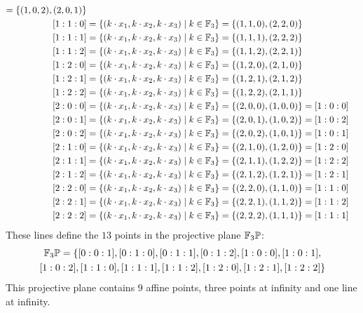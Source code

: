 \begin{example}
\begin{align*}
          = \{(1,0,2), (2,0,1)\}\\
[1:1:0] &= \{(k\cdot x_1,k\cdot x_2, k\cdot x_3)\;|\; k\in\mathbb{F}_3\}
          = \{(1,1,0), (2,2,0)\}\\
[1:1:1] &= \{(k\cdot x_1,k\cdot x_2, k\cdot x_3)\;|\; k\in\mathbb{F}_3\}
          = \{(1,1,1), (2,2,2)\}\\
[1:1:2]&= \{(k\cdot x_1,k\cdot x_2, k\cdot x_3)\;|\; k\in\mathbb{F}_3\}
          = \{(1,1,2), (2,2,1)\}\\
[1:2:0] &= \{(k\cdot x_1,k\cdot x_2, k\cdot x_3)\;|\; k\in\mathbb{F}_3\}
          = \{(1,2,0), (2,1,0)\}\\
[1:2:1] &= \{(k\cdot x_1,k\cdot x_2, k\cdot x_3)\;|\; k\in\mathbb{F}_3\}
          = \{(1,2,1), (2,1,2)\}\\
[1:2:2] &= \{(k\cdot x_1,k\cdot x_2, k\cdot x_3)\;|\; k\in\mathbb{F}_3\}
          = \{(1,2,2), (2,1,1)\}\\
[2:0:0] &= \{(k\cdot x_1,k\cdot x_2, k\cdot x_3)\;|\; k\in\mathbb{F}_3\}
          = \{(2,0,0), (1,0,0)\}
          = [1:0:0]\\
[2:0:1] &= \{(k\cdot x_1,k\cdot x_2, k\cdot x_3)\;|\; k\in\mathbb{F}_3\}
          = \{(2,0,1), (1,0,2)\}
          = [1:0:2]\\
[2:0:2] &= \{(k\cdot x_1,k\cdot x_2, k\cdot x_3)\;|\; k\in\mathbb{F}_3\}
          = \{(2,0,2), (1,0,1)\}
          = [1:0:1]\\
[2:1:0] &= \{(k\cdot x_1,k\cdot x_2, k\cdot x_3)\;|\; k\in\mathbb{F}_3\}
          = \{(2,1,0), (1,2,0)\}
          = [1:2:0]\\
[2:1:1] &= \{(k\cdot x_1,k\cdot x_2, k\cdot x_3)\;|\; k\in\mathbb{F}_3\}
          = \{(2,1,1), (1,2,2)\}
          = [1:2:2]\\
[2:1:2] &= \{(k\cdot x_1,k\cdot x_2, k\cdot x_3)\;|\; k\in\mathbb{F}_3\}
          = \{(2,1,2), (1,2,1)\}
          = [1:2:1]\\
[2:2:0] &= \{(k\cdot x_1,k\cdot x_2, k\cdot x_3)\;|\; k\in\mathbb{F}_3\}
          = \{(2,2,0), (1,1,0)\}
          = [1:1:0]\\
[2:2:1] &= \{(k\cdot x_1,k\cdot x_2, k\cdot x_3)\;|\; k\in\mathbb{F}_3\}
          = \{(2,2,1), (1,1,2)\}
          = [1:1:2]\\
[2:2:2] &= \{(k\cdot x_1,k\cdot x_2, k\cdot x_3)\;|\; k\in\mathbb{F}_3\}
          = \{(2,2,2), (1,1,1)\}
          = [1:1:1]
\end{align*}
These lines define the $13$ points in the projective plane $\mathbb{F}_3\mathbb{P}$:
\begin{multline*}
\mathbb{F}_3\mathbb{P} = \{ [0:0:1], [0:1:0], [0:1:1], [0:1:2], [1:0:0], [1:0:1], \\ [1:0:2], [1:1:0], [1:1:1], [1:1:2], [1:2:0], [1:2:1], [1:2:2]\}
\end{multline*}
This projective plane contains $9$ affine points, three points at infinity and one line at infinity.


\end{example}
